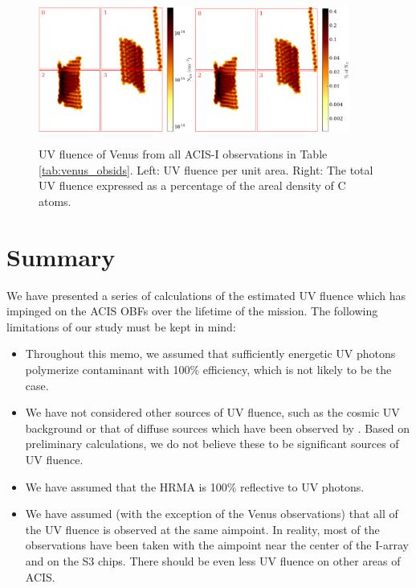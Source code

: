 \documentclass[11pt]{article}
\begin{document}
\begin{figure}
\begin{center}
\includegraphics[width=0.45\textwidth]{venus_all_fluence.eps}
\includegraphics[width=0.45\textwidth]{venus_all_fluence_percent.eps}
\caption{UV fluence of Venus from all ACIS-I observations in Table \ref{tab:venus_obsids}. Left: UV fluence per unit area.
Right: The total UV fluence expressed as a percentage of the areal density of C atoms.\label{fig:total_venus_fluence}}
\end{center}
\end{figure}

\section{Summary}

We have presented a series of calculations of the estimated UV fluence which has impinged on the ACIS OBFs
over the lifetime of the mission. The following limitations of our study must be kept in mind:

\begin{itemize}
\item Throughout this memo, we assumed that sufficiently energetic UV photons polymerize contaminant with 100\%
efficiency, which is not likely to be the case.
\item We have not considered other sources of UV fluence, such as the cosmic UV background or that of diffuse
sources which have been observed by \chandra. Based on preliminary calculations, we do not believe these to be
significant sources of UV fluence.
\item We have assumed that the HRMA is 100\% reflective to UV photons.
\item We have assumed (with the exception of the Venus observations) that all of the UV fluence is observed at the
same aimpoint. In reality, most of the observations have been taken with the aimpoint near the center of the I-array and
on the S3 chips. There should be even less UV fluence on other areas of ACIS.
\end{itemize}
\end{document}
